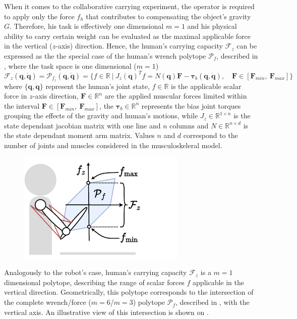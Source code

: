 When it comes to the collaborative carrying experiment, the operator is required to apply only the force $f_{h}$ that contributes to compensating the object's gravity $G$. Therefore, his task is effectively one dimensional $m=1$ and his physical ability to carry certain weight can be evaluated as the maximal applicable force in the vertical ($z$-axis) direction. Hence, the human's carrying capacity $\mathcal{F}_z$ can be expressed as the the special case of the human's wrench polytope $\mathcal{P}_{f}$, described in  , where the task space is one dimensional ($m=1$)
\begin{equation}
     \mathcal{F}_z(\bm{q},\dot{\bm{q}}) = \mathcal{P}_{f_z} (\bm{q},\dot{\bm{q}}) = \{ f \in \mathbb{R} ~|~ J_{z}(\bm{q})^Tf=N(\bm{q})\bm{F} - \bm{\tau}_b(\bm{q},\dot{\bm{q}}), \quad \bm{F}\in[\bm{F}_{min}, ~\bm{F}_{max}]\}
\end{equation}
where $\{\bm{q},\dot{\bm{q}}\}$ represent the human's joint state, $f \in\mathbb{R}$ is the applicable scalar force in $z$-axis direction, $\bm{F}\in\mathbb{R}^n$ are the applied muscular forces limited within the interval $\bm{F}\in[\bm{F}_{min}, ~\bm{F}_{max}]$, the $\bm{\tau}_{b}\in\mathbb{R}^n$ represents the bias joint torques grouping the effects of the gravity and human's motions, while $J_{z}\in\mathbb{R}^{1\times n}$ is the state dependant jacobian matrix with one line and $n$ columns and $N\in\mathbb{R}^{n\times d}$ is the state dependant moment arm matrix. Values $n$ and $d$ correspond to the number of joints and muscles considered in the musculoskeleral model.


\begin{figure}
    \centering
    \includegraphics[width=\linewidth]{Papers/images/carrying_capacity_human.pdf}
    \caption{}
    \label{fig:carrying_cap_human}
\end{figure}
Analogously to the robot's case, human's carrying capacity $\mathcal{F}_z$ is a $m=1$ dimensional polytope, describing the range of scalar forces $f$ applicable in the vertical direction. Geometrically, this polytope corresponds to the intersection of the complete wrench/force ($m=6$/$m=3$) polytope $\mathcal{P}_f$, described in , with the vertical axis. An illustrative view of this intersection is shown on .


